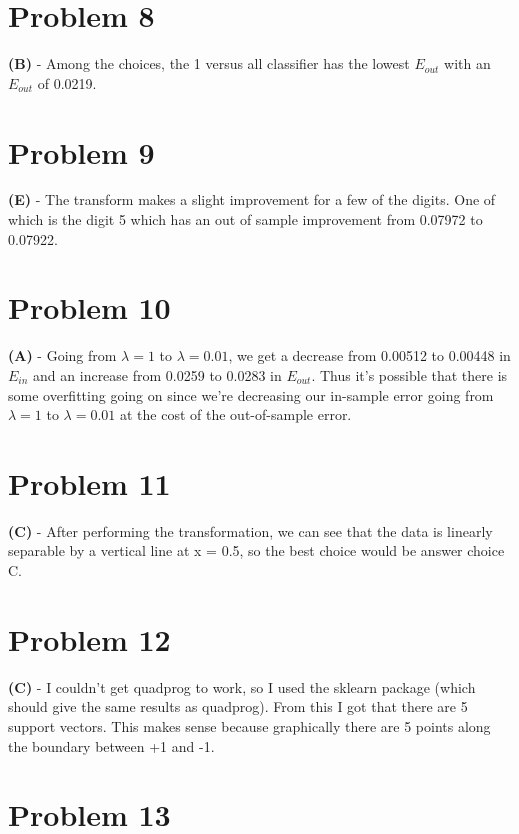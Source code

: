 \documentclass[10pt,letter]{article}
\begin{document}
\section*{Problem 8}

\textbf{(B)} - Among the choices, the 1 versus all classifier has the lowest $E_{out}$ with an $E_{out}$ of 0.0219.

\section*{Problem 9}

\textbf{(E)} - The transform makes a slight improvement for a few of the digits. One of which is the digit 5 which has an out of sample improvement from 0.07972 to 0.07922.

\section*{Problem 10}

\textbf{(A)} - Going from $\lambda = 1$ to $\lambda = 0.01$, we get a decrease from 0.00512 to 0.00448 in $E_{in}$ and an increase from 0.0259 to 0.0283 in $E_{out}$. Thus it's possible that there is some overfitting going on since we're decreasing our in-sample error going from $\lambda = 1$ to $\lambda = 0.01$ at the cost of the out-of-sample error.

\section*{Problem 11}

\textbf{(C)} - After performing the transformation, we can see that the data is linearly separable by a vertical line at x = 0.5, so the best choice would be answer choice C.

\section*{Problem 12}

\textbf{(C)} - I couldn't get quadprog to work, so I used the sklearn package (which should give the same results as quadprog). From this I got that there are 5 support vectors. This makes sense because graphically there are 5 points along the boundary between +1 and -1.

\section*{Problem 13}
\end{document}
